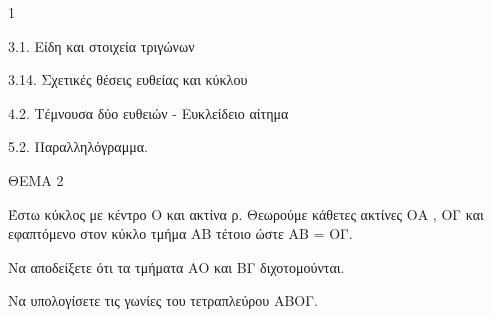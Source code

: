 \begin{ylh}{1}
    \item 3.1. Είδη και στοιχεία τριγώνων
    \item 3.14. Σχετικές θέσεις ευθείας και κύκλου
    \item 4.2. Τέμνουσα δύο ευθειών - Ευκλείδειο αίτημα
    \item 5.2. Παραλληλόγραμμα.
\end{ylh}

ΘΕΜΑ 2

Έστω κύκλος με κέντρο Ο και ακτίνα ρ. Θεωρούμε κάθετες ακτίνες ΟΑ , ΟΓ και εφαπτόμενο στον κύκλο τμήμα ΑΒ τέτοιο ώστε ΑΒ = ΟΓ.

\begin{alist}
\item Να αποδείξετε ότι τα τμήματα ΑΟ και ΒΓ διχοτομούνται. 

\item Να υπολογίσετε τις γωνίες του τετραπλεύρου ΑΒΟΓ. 


\begin{center}
\end{center}
\end{alist}
